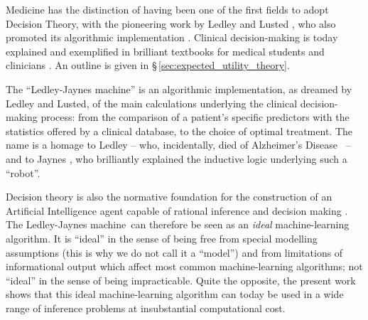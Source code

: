 \documentclass[utf8]{FrontiersinHarvard_mod} %
\newcommand*{\sect}{\S}%
\newcommand*{\chaps}{chs}%
\renewcommand*{\|}[1][]{\nonscript\:#1\vert\nonscript\:\mathopen{}}
\newcommand*{\ad}{Alzheimer's Disease}
\newcommand*{\ljm}{Ledley-Jaynes machine}
\begin{document}
Medicine has the distinction of having been one of the first fields to adopt Decision Theory, with the pioneering work by Ledley and Lusted \citep{ledleyetal1959,ledleyetal1959b,ledleyetal1960,lustedetal1960}, who also promoted its algorithmic implementation \citep[see especially \sect\,1-5 p.~21]{ledley1959,ledley1960}. Clinical decision-making is today explained and exemplified in brilliant textbooks for medical students and clinicians \citep{weinsteinetal1980,soxetal1988_r2013,huninketal2001_r2014}. An outline is given in \sect\,\ref{sec:expected_utility_theory}.

The \enquote{\ljm} is an algorithmic implementation, as dreamed by Ledley and Lusted, of the main calculations underlying the clinical decision-making process: from the comparison of a patient's specific predictors with the statistics offered by a clinical database, to the choice of optimal treatment. The name is a homage to Ledley -- who, incidentally, died of \ad\ \citep{shahetal2013} -- and to Jaynes \citeyearpar{jaynes1994_r2003}, who brilliantly explained the inductive logic underlying such a \enquote{robot}.


Decision theory is also the normative foundation for the construction of an Artificial Intelligence agent capable of rational inference and decision making \citetext{\citealt[part~IV]{russelletal1995_r2022}; \citealt[\chaps~1--2, 13--14]{jaynes1994_r2003}}. The \ljm\ can therefore be seen as an \emph{ideal} machine-learning algorithm. It is \enquote{ideal} in the sense of being free from special modelling assumptions (this is why we do not call it a \enquote{model}) and from limitations of informational output which affect most common machine-learning algorithms; not \enquote{ideal} in the sense of being impracticable. Quite the opposite, the present work shows that this ideal machine-learning algorithm can today be used in a wide range of inference problems at insubstantial computational cost. %
\end{document}
